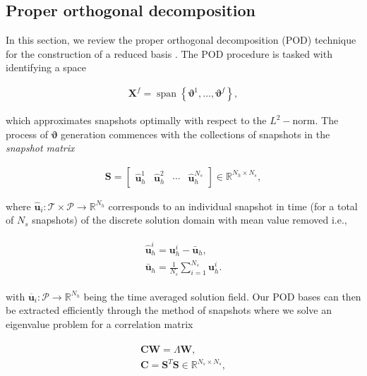\documentclass[preprint,12pt]{elsarticle}
\begin{document}
\subsection{Proper orthogonal decomposition}

In this section, we review the proper orthogonal decomposition (POD) technique for the construction of a reduced basis \cite{kosambi1943statistics,berkooz1993proper}. The POD procedure is tasked with identifying a space
\begin{linenomath*}
\begin{align}
\mathbf{X}^{f}=\operatorname{span}\left\{\boldsymbol{\vartheta}^{1}, \dots, \boldsymbol{\vartheta}^{f}\right\},
\end{align}
\end{linenomath*}
which approximates snapshots optimally with respect to the $L^2-$norm. The process of $\boldsymbol{\vartheta}$ generation commences with the collections of snapshots in the \emph{snapshot matrix}
\begin{linenomath*}
\begin{align}
\mathbf{S} = [\begin{array}{c|c|c|c}{\hat{\mathbf{u}}^{1}_h} & {\hat{\mathbf{u}}^{2}_h} & {\cdots} & {\hat{\mathbf{u}}^{N_{s}}_h}\end{array}] \in \mathbb{R}^{N_{h} \times N_{s}},
\end{align}
\end{linenomath*}
where $\hat{\mathbf{u}}_i : \mathcal{T} \times \mathcal{P} \rightarrow \mathbb{R}^{N_h}$ corresponds to an individual snapshot in time (for a total of $N_s$ snapshots) of the discrete solution domain with mean value removed i.e.,
\begin{linenomath*}
\begin{align}
\begin{gathered}
\hat{\mathbf{u}}^i_h = \mathbf{u}^i_h - \mathbf{\bar{u}}_h, \\
\mathbf{\bar{u}}_h = \frac{1}{N_s} \sum_{i=1}^{N_s} \mathbf{u}^i_h.
\end{gathered}
\end{align}
\end{linenomath*}
with $\overline{\mathbf{u}}_i : \mathcal{P} \rightarrow \mathbb{R}^{N_h}$ being the time averaged solution field. Our POD bases can then be extracted efficiently through the method of snapshots where we solve an eigenvalue problem for a correlation matrix
\begin{linenomath*}
\begin{align}
\begin{gathered}
\mathbf{C} \mathbf{W} = \Lambda \mathbf{W}, \\
\mathbf{C} = \mathbf{S}^T \mathbf{S} \in \mathbb{R}^{N_s \times N_s},
\end{gathered}
\end{align}
\end{linenomath*}
\end{document}
